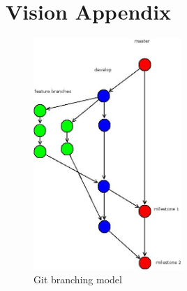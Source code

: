\section{Vision Appendix}
\label{apx:vision}

\begin{figure}[h!]
  \caption{Git branching model}
  \centering
    \includegraphics[width=0.5\textwidth]{gitbranch.jpg}
\end{figure}

